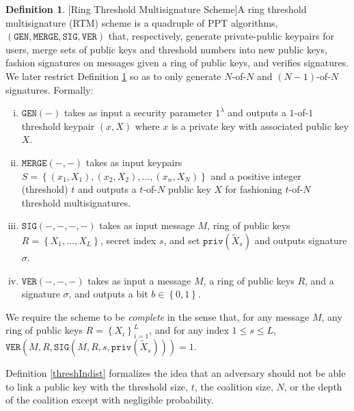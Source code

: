 \documentclass[12pt,english,oneside]{mrl}
\theoremstyle{definition}
\newtheorem{Defn}[lem]{Definition}
\newenvironment{defn}{\begin{Defn}\rm}{\end{Defn}}
\numberwithin{equation}{section}
\numberwithin{figure}{section}
\numberwithin{equation}{section}
\numberwithin{equation}{section}
\numberwithin{figure}{section}
\begin{document}
\begin{defn}{[Ring Threshold Multisignature Scheme]}\label{RTM} A ring threshold multisignature (RTM) scheme is a quadruple of PPT algorithms, $(
\texttt{GEN},\texttt{MERGE},\texttt{SIG},\texttt{VER})$ that, respectively, generate private-public keypairs for users, merge sets of public keys and threshold numbers into new public keys, fashion signatures on messages given a ring of public keys, and verifies signatures. We later restrict Definition \ref{RTM} so as to only generate $N$-of-$N$ and $(N-1)$-of-$N$ signatures. Formally:
\begin{enumerate}[(i)]
    \item $\texttt{GEN}(-)$ takes as input a security parameter $1^\lambda$ and outputs a $1$-of-$1$ threshold keypair $(x,X)$ where $x$ is a private key with associated public key $X$.
    \item $\texttt{MERGE}(-,-)$ takes as input keypairs $S=\left\{(x_1,X_1), (x_2,X_2), \ldots, (x_n,X_N)\right\}$ and a positive integer (threshold) $t$ and outputs a $t$-of-$N$ public key $X$ for fashioning $t$-of-$N$ threshold multisignatures.
    \item $\texttt{SIG}(-,-,-,-)$ takes as input message $M$, ring of public keys $R=\left\{X_1, \ldots, X_L\right\}$, secret index $s$, and set $\texttt{priv}(\tilde{X}_s)$ and outputs signature $\sigma$.
    \item $\texttt{VER}(-,-,-)$ takes as input a message $M$, a ring of public keys $R$, and a signature $\sigma$, and outputs a bit $b \in \left\{0,1\right\}$. 
\end{enumerate}
We require the scheme to be \textit{complete} in the sense that, for any message $M$, any ring of public keys $R = \left\{X_i\right\}_{i=1}^{L}$, and for any index $1 \leq s \leq L$, $\texttt{VER}(M,R,\texttt{SIG}(M,R,s,\texttt{priv}(\tilde{X}_s)))=1$.
\end{defn}




Definition \ref{threshIndist} formalizes the idea that an adversary should not be able to link a public key with the threshold size, $t$, the coalition size, $N$, or the depth of the coalition except with negligible probability. %
\end{document}
